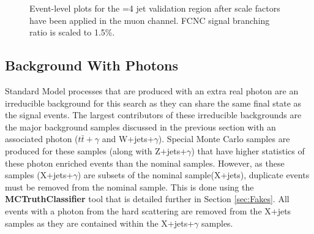 \begin{figure}[h!]
\hfil 
{}
\caption{Event-level plots for the =4 jet validation region after scale factors have been applied in the muon channel.  FCNC signal branching ratio is scaled to 1.5\%.}
\label{fig:VR3mujpostscale}
\end{figure}



\subsection{Background With Photons}
\label{sec:BKGPho}

Standard Model processes that are produced with an extra real photon are an irreducible background for this search as they can share the same final state as the signal events.  The largest contributors of these irreducible backgrounds are the major background samples discussed in the previous section with an associated photon ($t\bar{t}+\gamma$ and W+jets+$\gamma$).  Special Monte Carlo samples are produced for these samples (along with Z+jets+$\gamma$) that have higher statistics of these photon enriched events than the nominal samples.  However, as these samples (X+jets+$\gamma$) are subsets of the nominal sample(X+jets), duplicate events must be removed from the nominal sample.  This is done using the \textbf{MCTruthClassifier} tool that is detailed further in Section \ref{sec:Fakes}.  All events with a photon from the hard scattering are removed from the X+jets samples as they are contained within the X+jets+$\gamma$ samples.
